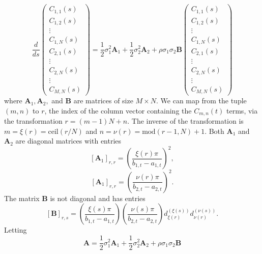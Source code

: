 \begin{equation}
	\frac{d}{ds} \left( \begin{array}{c} 
			C_{1,1}(s) \\
			C_{1,2}(s) \\
				\vdots \\
			C_{1,N}(s) \\
			C_{2,1}(s) \\
				\vdots \\
			C_{2,N}(s) \\
				\vdots \\
			C_{M,N}(s)
		\end{array} \right) = \frac{1}{2}\sigma^2_1 \mathbf{A}_1 + \frac{1}{2}\sigma^2_2 \mathbf{A}_2 + \rho\sigma_1 \sigma_2 \mathbf{B} \left( \begin{array}{c} 
			C_{1,1}(s) \\
			C_{1,2}(s) \\
				\vdots \\
			C_{1,N}(s) \\
			C_{2,1}(s) \\
				\vdots \\
			C_{2,N}(s) \\
				\vdots \\
			C_{M,N}(s)
		\end{array} \right) \label{eq:matrix-representation}
\end{equation}
where $\mathbf{A}_1, \mathbf{A}_2,$ and $\mathbf{B}$ are matrices of size $M \times N$. We can map from the tuple $(m,n)$ to $r$, the index of the column vector containing the $C_{m,n}(t)$ terms, via the transformation $r = (m-1)N + n$. The inverse of the transformation is $m = \xi(r) = \mbox{ceil}(r/N)$ and $n = \nu(r) = \mbox{mod}(r-1,N) + 1$. Both $\mathbf{A}_1$ and $\mathbf{A}_2$ are diagonal matrices with entries 
\[ \left[ \mathbf{A}_1 \right]_{r,r} = \left( \frac{\xi(r) \pi}{b_{1,t} - a_{1,t} } \right)^2, \]
\[ \left[ \mathbf{A}_1 \right]_{r,r} = \left( \frac{\nu(r) \pi}{b_{2,t} - a_{2,t} } \right)^2. \]
The matrix $\mathbf{B}$ is not diagonal and has entries 
\[ \left[ \mathbf{B} \right]_{r,s} = \left( \frac{\xi(s) \pi}{b_{1,t} - a_{1,t}} \right) \left( \frac{\nu(s) \pi}{b_{2,t} - a_{2,t}} \right) d_{\xi(r)}^{(\xi(s))} d_{\nu(r)}^{(\nu(s))}.  \]
Letting 
\begin{equation}
	\mathbf{A} = \frac{1}{2}\sigma^2_1 \mathbf{A}_1 + \frac{1}{2}\sigma^2_2 \mathbf{A}_2 + \rho\sigma_1 \sigma_2 \mathbf{B} \label{eq:ch3-system-matrix}
\end{equation}


